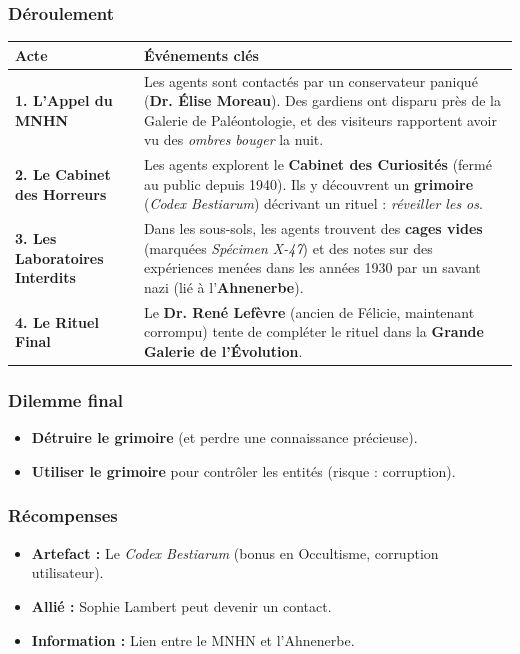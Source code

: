 \documentclass[10pt,a5paper,twoside]{book}
\begin{document}
\subsubsection*{Déroulement}
\begin{center}
	\begin{tabular}{|P{3cm}|P{9cm}|}
	\hline
	\textbf{Acte} 							& \textbf{Événements clés} \\ \hline
	\textbf{1. L'Appel du MNHN} 			& Les agents sont contactés par un conservateur paniqué (\textbf{Dr. Élise Moreau}). Des gardiens ont disparu près de la Galerie de Paléontologie, et des visiteurs rapportent avoir vu des \textit{ombres bouger} la nuit. \\ \hline
	\textbf{2. Le Cabinet des Horreurs} 	& Les agents explorent le \textbf{Cabinet des Curiosités} (fermé au public depuis 1940). Ils y découvrent un \textbf{grimoire} (\textit{Codex Bestiarum}) décrivant un rituel : \textit{réveiller les os}. \\ \hline
	\textbf{3. Les Laboratoires Interdits} 	& Dans les sous-sols, les agents trouvent des \textbf{cages vides} (marquées \textit{Spécimen X-47}) et des notes sur des expériences menées dans les années 1930 par un savant nazi (lié à l'\textbf{Ahnenerbe}). \\ \hline
	\textbf{4. Le Rituel Final} 			& Le \textbf{Dr. René Lefèvre} (ancien de Félicie, maintenant corrompu) tente de compléter le rituel dans la \textbf{Grande Galerie de l'Évolution}. \\ \hline
	\end{tabular}
\end{center}

\subsubsection*{Dilemme final}
\begin{itemize}
	\item \textbf{Détruire le grimoire} (et perdre une connaissance précieuse).
	\item \textbf{Utiliser le grimoire} pour contrôler les entités (risque : corruption).
\end{itemize}

\subsubsection*{Récompenses}
\begin{itemize}
	\item \textbf{Artefact :} Le \textit{Codex Bestiarum} (bonus en Occultisme, corruption utilisateur).
	\item \textbf{Allié :} Sophie Lambert peut devenir un contact.
	\item \textbf{Information :} Lien entre le MNHN et l'Ahnenerbe.
\end{itemize}
\end{document}

